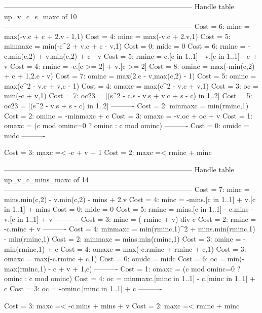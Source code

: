 --------------------------------------------------------------------------------
Handle table up_v_c_s_maxc of 10
--------------------------------------------------------------------------------
Cost =  6:  minc    = max(-v.c + c + 2.v - 1,1)
Cost =  4:  minc    = max(-v.c + 2.v,1)
Cost =  5:  minmaxc = min(-c^2 + v.c + c - v,1)
Cost =  0:  midc    = 0
Cost =  6:  rminc   = -c.min(c,2) + v.min(c,2) + c - v
Cost =  5:  rminc   = c.[c in 1..1] - v.[c in 1..1] - c + v
Cost =  4:  rminc   = -c.[c >= 2] + v.[c >= 2]
Cost =  8:  ominc   = max(-min(c,2) + c + 1,2.c - v)
Cost =  7:  ominc   = max(2.c - v,max(c,2) - 1)
Cost =  5:  ominc   = max(c^2 - v.c + v,c - 1)
Cost =  4:  omaxc   = max(c^2 - v.c + v,1)
Cost =  3:  oc      = min(-c + v,1)
Cost =  7:  oc23    = [(s^2 - c.s - v.s + v.c + s - c) in 1..2]
Cost =  5:  oc23    = [(s^2 - v.s + s - c) in 1..2]
----------
Cost =  2:  minmaxc = min(rminc,1)
Cost =  2:  ominc   = -minmaxc + c
Cost =  3:  omaxc   = -v.oc + oc + v
Cost =  1:  omaxc   = (c mod ominc=0 ? ominc : c mod ominc)
----------
Cost =  0:  omidc   = midc
----------

Cost =  3:  maxc =< -c + v + 1
Cost =  2:  maxc =< rminc + minc

--------------------------------------------------------------------------------
Handle table up_v_c_mins_maxc of 14
--------------------------------------------------------------------------------
Cost =  7:  minc    = mins.min(c,2) - v.min(c,2) - mins + 2.v
Cost =  4:  minc    = -mins.[c in 1..1] + v.[c in 1..1] + mins
Cost =  0:  midc    = 0
Cost =  5:  rminc   = mins.[c in 1..1] - c.mins - v.[c in 1..1] + v
----------
Cost =  3:  minc    = (-rminc + v) div c
Cost =  2:  rminc   = -c.minc + v
----------
Cost =  4:  minmaxc = min(rminc,1)^2 + mins.min(rminc,1) - min(rminc,1)
Cost =  2:  minmaxc = mins.min(rminc,1)
Cost =  3:  ominc   = -min(rminc,1) + c
Cost =  4:  omaxc   = max(-c.rminc + rminc + c,1)
Cost =  3:  omaxc   = max(-c.rminc + c,1)
Cost =  0:  omidc   = midc
Cost =  6:  oc      = min(-max(rminc,1) - c + v + 1,c)
----------
Cost =  1:  omaxc   = (c mod ominc=0 ? ominc : c mod ominc)
Cost =  4:  oc      = minmaxc.[minc in 1..1] - c.[minc in 1..1] + c
Cost =  3:  oc      = -ominc.[minc in 1..1] + c
----------

Cost =  3:  maxc =< -c.mins + mins + v
Cost =  2:  maxc =< rminc + minc

